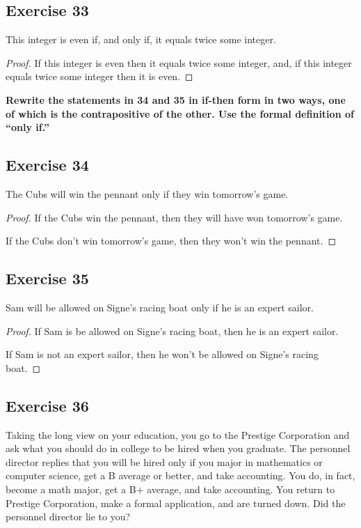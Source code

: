 \documentclass[14pt]{extarticle}
\begin{document}
\subsection{Exercise 33}
This integer is even if, and only if, it equals twice some integer.

\begin{proof}
    If this integer is even then it equals twice some integer, and, if this integer equals twice some integer then it is even. \end{proof}

{\bf Rewrite the statements in 34 and 35 in if-then form in two ways, one of which is the contrapositive of the other. Use the formal definition of “only if.”}

\subsection{Exercise 34}
The Cubs will win the pennant only if they win tomorrow’s game.

\begin{proof}
    If the Cubs win the pennant, then they will have won tomorrow’s game.

    If the Cubs don't win tomorrow's game, then they won't win the pennant.
\end{proof}

\subsection{Exercise 35}
Sam will be allowed on Signe’s racing boat only if he is an expert sailor.

\begin{proof}
    If Sam is be allowed on Signe’s racing boat, then he is an expert sailor.

    If Sam is not an expert sailor, then he won't be allowed on Signe’s racing boat.
\end{proof}

\subsection{Exercise 36}
Taking the long view on your education, you go to the Prestige Corporation and ask what you should do in college to be hired when you graduate. The personnel director replies that you will be hired only if you major in mathematics or computer science, get a B average or better, and take accounting. You do, in fact, become a math major, get a B+ average, and take accounting. You return to Prestige Corporation, make a formal application, and are turned down. Did the personnel director lie to you?
\end{document}
